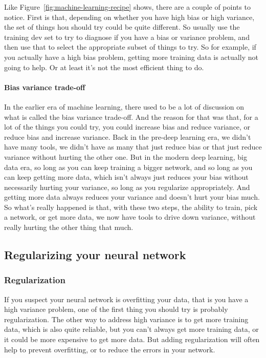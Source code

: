 \documentclass[UTF8]{article}
\begin{document}
Like Figure~\ref{fig:machine-learning-recipe} shows, there are a couple of points to notice. First
is that, depending on whether you have high bias or high variance, the set of things hou should try
could be quite different. So usually use the training dev set to try to diagnose if you have a bias
or variance problem, and then use that to select the appropriate subset of things to try. So for
example, if you actually have a high bias problem, getting more training data is actually not going
to help. Or at least it's not the most efficient thing to do.

\paragraph{Bias variance trade-off} In the earlier era of machine learning, there used to be a lot
of discussion on what is called the bias variance trade-off. And the reason for that was that, for
a lot of the things you could try, you could increase bias and reduce variance, or reduce bias and
increase variance. Back in the pre-deep learning era, we didn't have many tools, we didn't have
as many that just reduce bias or that just reduce variance without hurting the other one. But in
the modern deep learning, big data era, so long as you can keep training a bigger network, and so
long as you can keep getting more data, which isn't always just reduces your bias without
necessarily hurting your variance, so long as you regularize appropriately. And getting more data
always reduces your variance and doesn't hurt your bias much. So what's really happened is that,
with these two steps, the ability to train, pick a network, or get more data, we now have tools to
drive down variance, without really hurting the other thing that much.

\subsection{Regularizing your neural network}
\subsubsection{Regularization}
If you suspect your neural network is overfitting your data, that is you have a high variance
problem, one of the first thing you should try is probably regularization. The other way to address
high variance is to get more training data, which is also quite reliable, but you can't always get
more training data, or it could be more expensive to get more data. But adding regularization
will often help to prevent overfitting, or to reduce the errors in your network.
\end{document}
